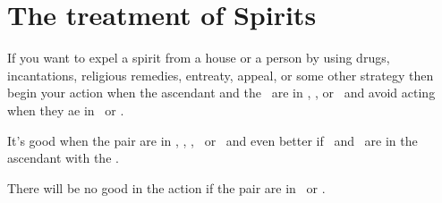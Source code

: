 \section{The treatment of Spirits}
If you want to expel a spirit from a house or a person by using drugs, incantations, religious remedies, entreaty,  appeal, or some other strategy then begin your action when the ascendant and the \Moon\, are in \Aries, \Taurus, or \Gemini\, and avoid acting when they ae in \Cancer\, or \Leo.

It's good when the pair are in \Virgo, \Libra, \Sagittarius, \Capricorn\, or \Pisces\, and even better if \Jupiter\, and \Venus\, are in the ascendant with the \Moon.

There will be no good in the action if the pair are in \Scorpio\, or \Aquarius.
